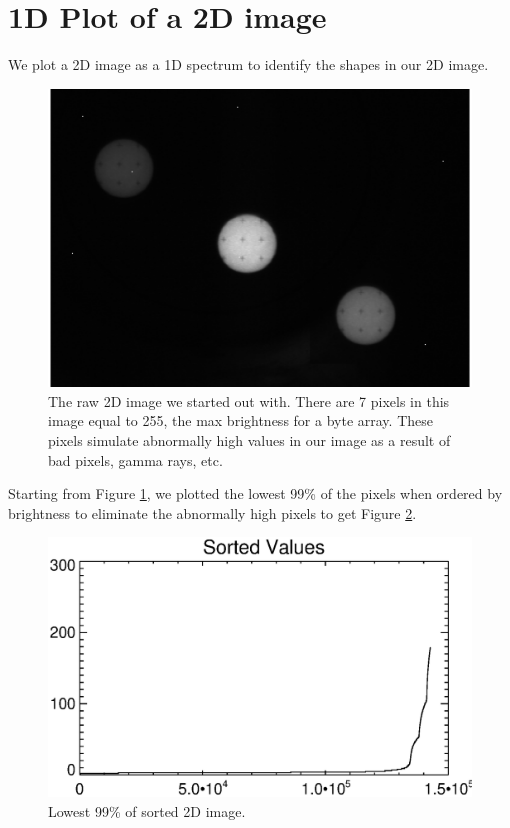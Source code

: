 \documentclass[10pt]{scrartcl}
\begin{document}

\section{1D Plot of a 2D image} %
\label{sec:1d_plot_of_a_2d_image}
We plot a 2D image as a 1D spectrum to identify the shapes in our 2D image.


\begin{figure}[!ht]
    \centering
    \includegraphics[width=.9\textwidth]{../plots_tables_images/raw.eps}
    \caption{The raw 2D image we started out with. There are 7 pixels in this image equal to 255, the max brightness for a byte array. These pixels simulate abnormally high values in our image as a result of bad pixels, gamma rays, etc.}
    \label{raw}
\end{figure}

Starting from Figure \ref{raw}, we plotted the lowest 99\% of the pixels when ordered by brightness to eliminate the abnormally high pixels to get Figure \ref{sorted}.

\begin{figure}[!ht]
    \centering
    \includegraphics[width=.9\textwidth]{../plots_tables_images/sorted_array.eps}
    \caption{Lowest 99\% of sorted 2D image.}
    \label{sorted}
\end{figure}
\end{document}
